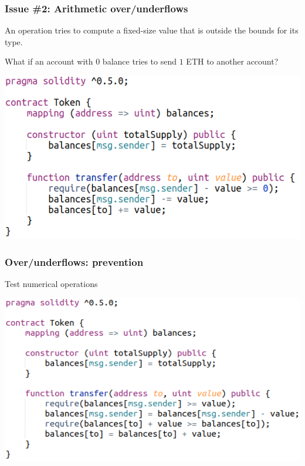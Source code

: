 \documentclass[11pt]{beamer}  %
\begin{document}
\begin{frame}\frametitle{Issue \#2: Arithmetic over/underflows}

  \begin{redbox}{}
    An operation tries to compute a fixed-size value that is outside the
    bounds for its type.
  \end{redbox}

  \bigskip

  \begin{greenbox}{What if an account with $0$ balance tries to send $1$ ETH to another account?}
    \begin{center}
      \includegraphics[scale=0.5,clip=false]{pictures/under-overflow.png}
    \end{center}
  \end{greenbox}
  
\end{frame}

\begin{frame}\frametitle{Over/underflows: prevention}

  \begin{greenbox}{Test numerical operations}
    \begin{center}
      \includegraphics[scale=0.45,clip=false]{pictures/under-overflow-fixed-check.png}
    \end{center}
  \end{greenbox}
    
\end{frame}
\end{document}

